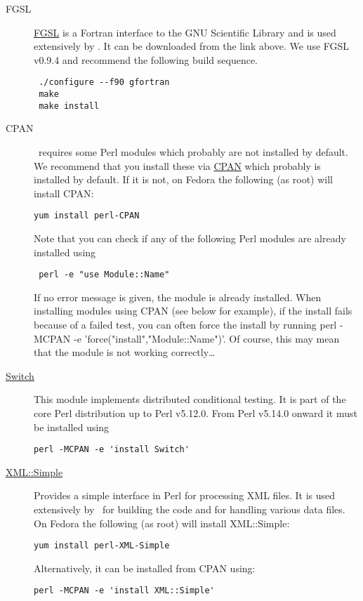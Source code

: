 \begin{description}
\item [FGSL] \href{http://www.lrz-muenchen.de/services/software/mathematik/gsl/fortran/}{FGSL} is a Fortran interface to the GNU Scientific Library and is used extensively by \glc. It can be downloaded from the link above. We use FGSL v0.9.4 and recommend the following build sequence. 
\begin{verbatim}
 ./configure --f90 gfortran
 make
 make install
\end{verbatim}

\item [CPAN] \glc\ requires some Perl modules which probably are not installed by default. We recommend that you install these via \href{http://www.cpan.org/}{CPAN} which probably is installed by default. If it is not, on Fedora the following (as root) will install CPAN:
\begin{verbatim}
yum install perl-CPAN
\end{verbatim}
Note that you can check if any of the following Perl modules are already installed using
\begin{verbatim}
 perl -e "use Module::Name"
\end{verbatim}
If no error message is given, the module is already installed. When installing modules using CPAN (see below for example), if the install fails because of a failed test, you can often force the install by running {\normalfont \ttfamily perl -MCPAN -e 'force("install","Module::Name")'}. Of course, this may mean that the module is not working correctly\ldots

\item [\href{http://search.cpan.org/~rgarcia/Switch-2.16/Switch.pm}{{\normalfont \ttfamily Switch }}] This module implements distributed conditional testing. It is part of the core Perl distribution up to Perl v5.12.0. From Perl v5.14.0 onward it must be installed using
\begin{verbatim}
perl -MCPAN -e 'install Switch'
\end{verbatim}

\item [\href{http://search.cpan.org/~grantm/XML-Simple-2.18/lib/XML/Simple.pm}{{\normalfont \ttfamily XML::Simple}}] Provides a simple interface in Perl for processing XML files. It is used extensively by \glc\ for building the code and for handling various data files. On Fedora the following (as root) will install {\normalfont \ttfamily XML::Simple}:
\begin{verbatim}
yum install perl-XML-Simple
\end{verbatim}
Alternatively, it can be installed from CPAN using:
\begin{verbatim}
perl -MCPAN -e 'install XML::Simple'
\end{verbatim}


\end{description}
